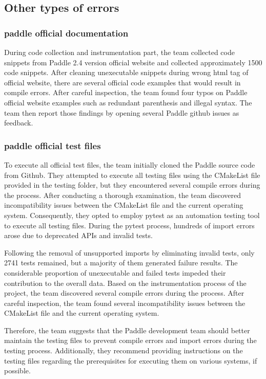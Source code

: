 \documentclass[sigconf]{acmart}
\begin{document}
  \subsection{Other types of errors}
  \subsubsection{paddle official documentation}
  During code collection and instrumentation part, the team collected code snippets from Paddle 2.4 version 
  official website and collected approximately 1500 code snippets. After cleaning unexecutable snippets during wrong 
  html tag of official website, there are several official code examples that would result in compile errors. After careful inspection,
   the team found four typos on Paddle official website examples such as redundant parenthesis and illegal syntax. 
   The team then report those findings by opening several Paddle github issues as feedback.
  \subsubsection{paddle official test files}
  To execute all official test files, the team initially cloned the Paddle source code from Github. They attempted to execute all testing files using the CMakeList file provided in the testing folder, but they encountered several compile errors during the process. After conducting a thorough examination, the team discovered incompatibility issues between the CMakeList file and the current operating system. Consequently, they opted to employ pytest as an automation testing tool to execute all testing files. During the pytest process, hundreds of import errors arose due to deprecated APIs and invalid tests.

  Following the removal of unsupported imports by eliminating invalid tests, only 2741 tests remained, but a majority of them generated failure results. The considerable proportion of unexecutable and failed tests impeded their contribution to the overall data. Based on the instrumentation process of the project, the team discovered several compile errors during the process. After careful inspection, the team found several incompatibility issues between the CMakeList file and the current operating system.

  Therefore, the team suggests that the Paddle development team should better maintain the testing files to prevent compile errors and import errors during the testing process. Additionally, they recommend providing instructions on the testing files regarding the prerequisites for executing them on various systems, if possible.
  
\end{document}
